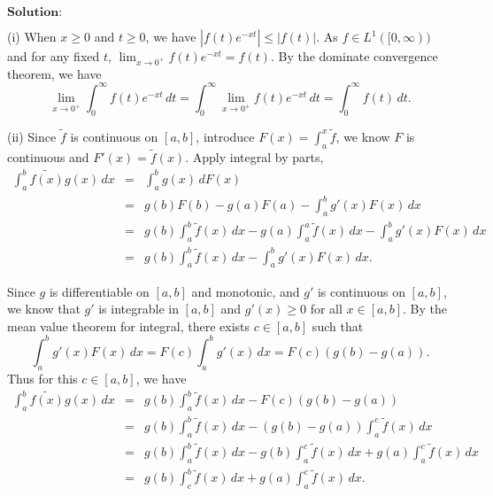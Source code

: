\documentclass[12pt,a4paper]{ctexart}
\begin{document}
\vspace{8pt}
$\textbf{Solution:}$

(i) When $x \geq 0$ and $t \geq 0$, we have $|f(t) e^{- x t}| \leq |f(t)|$. As $f \in L^{1}([0, \infty))$ and for any fixed $t$, $\lim_{x \to 0^{+}} f(t) e^{- x t} = f(t)$. By the dominate convergence theorem, we have
\begin{equation*}
    \lim_{x \to 0^{+}} \int_{0}^{\infty} f(t) e^{- x t} \, d t = \int_{0}^{\infty} \lim_{x \to 0^{+}} f(t) e^{- x t} \, d t = \int_{0}^{\infty} f(t) \, d t. 
\end{equation*}

(ii) Since $\tilde{f}$ is continuous on $[a, b]$, introduce $F(x) = \int_{a}^{x} \tilde{f}$,  we know $F$ is continuous and $F'(x) = \tilde{f}(x)$. Apply integral by parts, 
\begin{eqnarray*}
\int_{a}^{b} \tilde{f(x)} g(x) \, d x & = & \int_{a}^{b} g(x) \, d F(x) \\
& = & g(b) F(b) - g(a) F(a) - \int_{a}^{b} g'(x) F(x) \, d x  \\
& = & g(b) \int_{a}^{b} \tilde{f} (x) \, d x - g(a) \int_{a}^{a} \tilde{f} (x) \, d x - \int_{a}^{b} g'(x) F(x) \, d x  \\
& = &  g(b) \int_{a}^{b} \tilde{f} (x) \, d x - \int_{a}^{b} g'(x) F(x) \, d x.
\end{eqnarray*}

Since $g$ is differentiable on $[a, b]$ and monotonic, and $g'$ is continuous on $[a, b]$, we know that $g'$ is integrable in $[a, b]$ and $g'(x) \geq 0$ for all $x \in [a, b]$. By the mean value theorem for integral, there exists $c \in [a, b]$ such that
\begin{equation*}
   \int_{a}^{b} g'(x) F(x) \, d x = F(c) \int_{a}^{b} g'(x) \, d x = F(c) (g(b) - g(a)).
\end{equation*}
Thus for this $c \in [a, b]$, we have
\begin{eqnarray*}
\int_{a}^{b} \tilde{f(x)} g(x) \, d x & = & g(b) \int_{a}^{b} \tilde{f} (x) \, d x - F(c) (g(b) - g(a)) \\
& = & g(b) \int_{a}^{b} \tilde{f} (x) \, d x - (g(b) - g(a)) \int_{a}^{c} \tilde{f} (x) \, d x \\
& = & g(b) \int_{a}^{b} \tilde{f} (x) \, d x - g(b) \int_{a}^{c} \tilde{f} (x) \, d x + g(a) \int_{a}^{c} \tilde{f} (x) \, d x  \\
& = &  g(b) \int_{c}^{b} \tilde{f} (x) \, d x + g(a) \int_{a}^{c} \tilde{f} (x) \, d x.
\end{eqnarray*}
\end{document}
